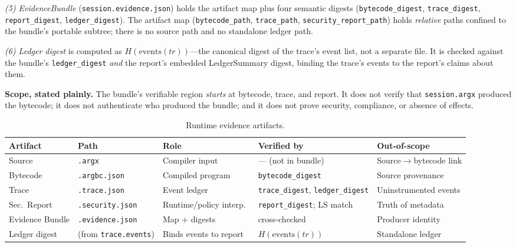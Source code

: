 \documentclass[conference]{IEEEtran}
\newcommand{\code}[1]{\texttt{\small #1}}
\newcommand{\dgst}[1]{\code{#1\_\allowbreak digest}}
\begin{document}
\emph{(5) EvidenceBundle} (\code{session.evidence.json}) holds the artifact map plus four
semantic digests (\code{bytecode\_digest}, \code{trace\_digest}, \code{report\_digest},
\code{ledger\_digest}). The artifact map (\code{bytecode\_path}, \code{trace\_path},
\code{security\_report\_path}) holds \emph{relative} paths confined to the bundle's
portable subtree; there is no source path and no standalone ledger path.

\emph{(6) Ledger digest} is computed as $H(\mathrm{events}(tr))$---the canonical digest
of the trace's event list, not a separate file. It is checked against the bundle's
\code{ledger\_digest} \emph{and} the report's embedded LedgerSummary digest, binding the
trace's events to the report's claims about them.

\noindent\textbf{Scope, stated plainly.} The bundle's verifiable region \emph{starts} at
bytecode, trace, and report. It does not verify that \code{session.argx} produced the
bytecode; it does not authenticate who produced the bundle; and it does not prove
security, compliance, or absence of effects.

\begin{table}[t]
\centering
\caption{Runtime evidence artifacts.}
\label{tab:artifacts}
\renewcommand{\arraystretch}{1.25}
\scriptsize
\setlength{\tabcolsep}{3pt}
\begin{tabular}{@{}L{0.13\columnwidth}L{0.18\columnwidth}L{0.15\columnwidth}L{0.24\columnwidth}L{0.16\columnwidth}@{}}
\toprule
\textbf{Artifact} & \textbf{Path} & \textbf{Role} & \textbf{Verified by} & \textbf{Out-of-scope} \\
\midrule
Source & \code{.argx} & Compiler input & --- (not in bundle) & Source$\to$\allowbreak bytecode link \\
Bytecode & \code{.argbc\allowbreak.json} & Compiled program & \dgst{bytecode} & Source provenance \\
Trace & \code{.trace\allowbreak.json} & Event ledger & \dgst{trace}, \dgst{ledger} & Un\-in\-stru\-mented events \\
Sec.\ Report & {\scriptsize\texttt{.security\allowbreak.json}} & Runtime/\allowbreak policy interp.\ & \dgst{report}; LS match & Truth of metadata \\
Evidence Bundle & {\scriptsize\texttt{.evidence\allowbreak.json}} & Map + digests & cross-checked & Producer identity \\
Ledger digest & (from \code{trace\allowbreak.events}) & Binds events to report & $H(\mathrm{events}(tr))$ & Standalone ledger \\
\bottomrule
\end{tabular}
\end{table}
\end{document}
